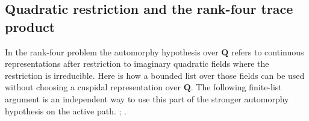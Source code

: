 \subsection{Quadratic restriction and the rank-four trace product}

In the rank-four problem the automorphy hypothesis over \(\mathbf Q\)
refers to continuous representations after restriction to imaginary
quadratic fields where the restriction is irreducible. Here is how a
bounded list over those fields can be used without choosing a
cuspidal representation over \(\mathbf Q\).
The following finite-list argument is an independent way to use this
part of the stronger automorphy hypothesis on the active path.
;
.


